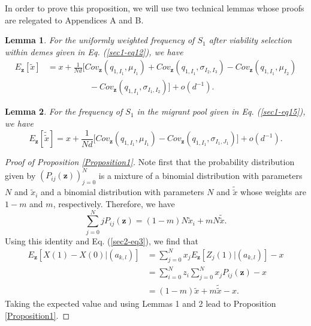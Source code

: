 \documentclass[11pt]{article}
\newtheorem{lemma}{Lemma}
\begin{document}
In order to prove this proposition, we will use two  technical lemmas whose proofs are relegated to Appendices A and B.


\begin{lemma}\label{lemma1}
For the uniformly weighted frequency of $S_1$ after viability selection within demes given in Eq. (\ref{sec1-eq12}), we have
\begin{align}\label{sec2-eq7}
E_{\mathbf{z}}\left[\tilde{x}\right]&=x+\frac{1}{Nd}\Big[Cov_{\mathbf{z}}(q_{1,I_1},\mu_{I_1})+Cov_{\mathbf{z}}(q_{1,I_1},\sigma_{I_2,I_3})-Cov_{\mathbf{z}}(q_{1,I_1},\mu_{I_2})\nonumber\\
&\quad\quad\quad\quad\quad-Cov_{\mathbf{z}}(q_{1,I_1},\sigma_{I_1,I_2})\Big]+o(d^{-1}).
\end{align}
\end{lemma}



\begin{lemma}\label{lemma2}
For the frequency of $S_1$ in the migrant pool given in Eq. (\ref{sec1-eq15}), we have
\begin{equation}\label{sec2-eq12}
E_{\mathbf{z}}\left[\tilde{\tilde{x}}\right]=x+\frac{1}{Nd}\Big[Cov_{\mathbf{z}}(q_{1,I_1},\mu_{I_1})-Cov_{\mathbf{z}}(q_{1,I_1},\sigma_{I_1,J_1})\Big]+o\left(d^{-1}\right).
\end{equation}
\end{lemma}



\begin{proof}[Proof of Proposition \ref{Proposition1}] 
Note first that the probability distribution given by $(P_{ij}(\mathbf{z}))_{j=0}^{N}$ is a mixture of a binomial distribution with parameters $N$ and $\tilde{x}_i$ and a binomial distribution with parameters $N$ and $\tilde{\tilde{x}}$ whose weights are $1-m$ and $m$, respectively. Therefore, we have
\begin{equation}\label{sec2-eq15}
\sum_{j=0}^{N}jP_{ij}(\mathbf{z})=(1-m)N\tilde{x}_i+mN\tilde{\tilde{x}}.
\end{equation}
Using this identity and Eq. (\ref{sec2-eq3}), we find that
\begin{align}\label{sec2-eq16}
E_{\mathbf{z}}\left[X(1)-X(0)\Big|(a_{k,l})\right]&=\sum_{j=0}^{N}x_jE_{\mathbf{z}}\left[Z_{j}(1)\Big|(a_{k,l})\right]-x\nonumber\\
&=\sum_{i=0}^{N}z_i\sum_{j=0}^{N}x_jP_{ij}(\mathbf{z})-x\nonumber\\
&=(1-m)\tilde{x}+m\tilde{\tilde{x}}-x.
\end{align}
Taking the expected value and using Lemmas 1 and 2 lead  to Proposition \ref{Proposition1}.
\end{proof}
\end{document}
